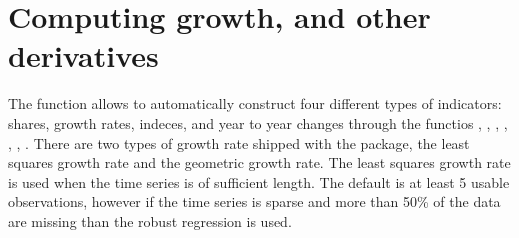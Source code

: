 \documentclass[nojss]{jss}\usepackage[]{graphicx}\usepackage[]{color}
\begin{document}
\section{Computing growth, and other derivatives}
The function  allows to automatically construct four different types of indicators: shares, growth rates, indeces, and year to year changes through the functios , , , , , , . There are two types of growth rate shipped with the package, the least squares growth rate and the geometric growth rate. The least squares growth rate is used when the time series is of sufficient length. The default is at least 5 usable observations, however if the time series is sparse and more than 50\% of the data are missing than the robust regression is used.
\end{document}
